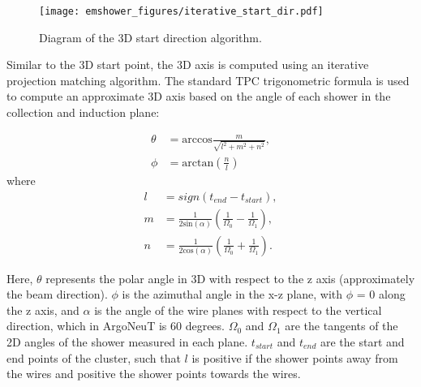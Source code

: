 \begin{figure}[h!]
  \centering
  \texttt{[image: emshower\_figures/iterative\_start\_dir.pdf]}
  \caption{Diagram of the 3D start direction algorithm.}
  \label{fig:iterative_start_dir}
\end{figure}


Similar to the 3D start point, the 3D axis is computed using an iterative projection matching algorithm.  The standard TPC trigonometric formula is used to compute an approximate 3D axis based on the angle of each shower in the collection and induction plane:

\begin{align}
  \theta &= \text{arccos}\frac{m}{\sqrt{l^2 + m^2 + n^2}}, \\
  \phi &= \text{arctan}\left(\frac{n}{l}\right) 
\end{align}
where
\begin{align}
l &= sign(t_{end} - t_{start}), \\
m &= \frac{1}{2 \text{sin}(\alpha)}\left(\frac{1}{\Omega_0} - \frac{1}{\Omega_1}\right), \\
n &= \frac{1}{2 \text{cos}(\alpha)}\left(\frac{1}{\Omega_0} + \frac{1}{\Omega_1}\right).
\end{align}

Here, $\theta$ represents the polar angle in 3D with respect to the z axis (approximately the beam direction).  $\phi$ is the azimuthal angle in the x-z plane, with $\phi$ = 0 along the z axis, and  $\alpha$ is the angle of the wire planes with respect to the vertical direction, which in ArgoNeuT is 60 degrees.  $\Omega_0$ and $\Omega_1$ are the tangents of the 2D angles of the shower measured in each plane.  $t_{start}$ and $t_{end}$ are the start and end points of the cluster, such that $l$ is positive if the shower points away from the wires and positive the shower points towards the wires.


